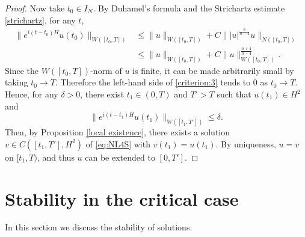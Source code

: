 \documentclass[11pt,a4paper]{article}
\numberwithin{equation}{section}
\begin{document}
\begin{proof}
Now take $t_{0} \in I_{N}$. By Duhamel's formula and the Strichartz estimate \eqref{strichartz}, for any $t$,
\begin{equation}\label{criterion:3}
\begin{aligned}
\|e^{i(t-t_{0})H}u(t_{0})\|_{W([t_{0}, T])}
&\leq \|u\|_{W([t_{0}, T])} + C\||u|^{\frac{8}{n-4}}u\|_{N([t_{0}, T])} \\
&\leq \|u\|_{W([t_{0}, T])} + C\|u\|_{W([t_{0}, T])}^{\frac{n+4}{n-4}}.
\end{aligned}
\end{equation}
Since the $W([t_{0}, T])$-norm of $u$ is finite, it can be made arbitrarily small by taking $t_{0}\to T$.
Therefore the left-hand side of \eqref{criterion:3} tends to $0$ as $t_{0}\to T$.
Hence, for any $\delta > 0$, there exist $t_{1} \in (0, T)$ and $T' > T$ such that $u(t_{1}) \in H^{2}$ and
\begin{equation}\label{criterion:4}
\|e^{i(t-t_{1})H}u(t_{1})\|_{W([t_{1}, T'])} \leq \delta.
\end{equation}
Then, by Proposition \ref{local existence}, there exists a solution $v \in C([t_{1}, T'], H^{2})$ of \eqref{eq:NL4S} with $v(t_{1}) = u(t_{1})$.
By uniqueness, $u = v$ on $[t_{1}, T)$, and thus $u$ can be extended to $[0, T']$.
\end{proof}

\section{Stability in the critical case}

In this section we discuss the stability of solutions.
\end{document}
